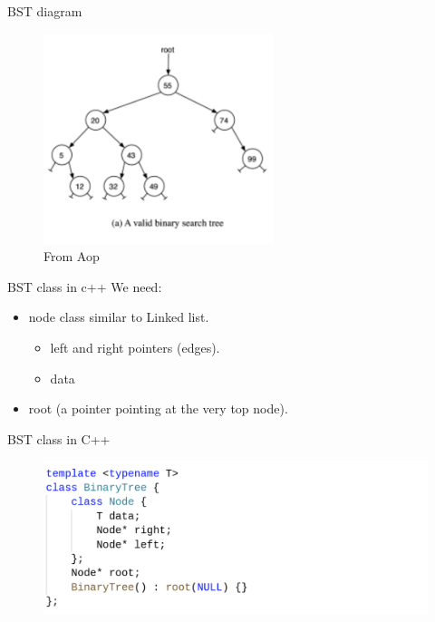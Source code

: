 \documentclass{beamer}
\begin{document}
\begin{frame}{BST diagram}
        \begin{figure}
            \includegraphics[width=0.6\textwidth]{BST_fig.png}
            \caption{From Aop}
    \end{figure}
\end{frame}

\begin{frame}{BST class in c++}
    We need:
    \begin{itemize}
        \item node class similar to Linked list.
            \begin{itemize}
                \item left and right pointers (edges). 
                \item data
            \end{itemize}
        \item root (a pointer pointing at the very top node).
    \end{itemize}
\end{frame}

\begin{frame}{BST class in C++}
        \begin{figure}
            \includegraphics[width=\textwidth]{BST_class.png}
    \end{figure}
\end{frame}
\end{document}
